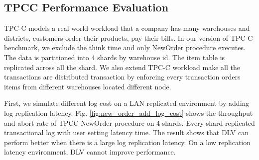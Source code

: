 \documentclass[conference]{IEEEtran}
\begin{document}
\subsection{TPCC Performance Evaluation}

TPC-C\cite{TPCC:conf/tpctc/NambiarWMTLCM11} models a real world workload that a company has many warehouses and districts, customers order their products, pay their bills.
In our version of TPC-C benchmark,
we exclude the think time and only NewOrder procedure executes.
The data is partitioned into 4 shards by warehouse id.
The item table is replicated across all the shard.
We also extend TPC-C workload make all the transactions are distributed transaction by enforcing every transaction orders items from different warehouses located different node.

First, we simulate different log cost on a LAN replicated environment by adding log replication latency.
Fig.   \ref{fig:new_order_add_log_cost} shows the throughput and abort rate of TPCC NewOrder procedure on 4 shards. 
Every shard replicated transactional log with user setting latency time.
The result shows that DLV can perform better when there is a large log replication latency.
On a low replication latency environment, DLV cannot improve performance.
\end{document}
